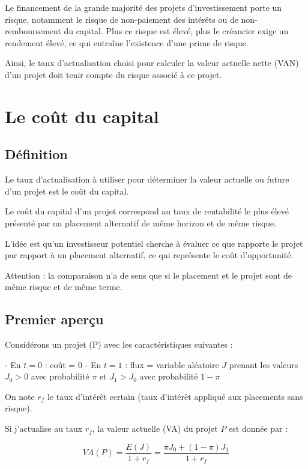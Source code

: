 \documentclass[a4paper, 12pt]{report}
\begin{document}
Le financement de la grande majorité des projets d'investissement porte un risque, notamment le risque de non-paiement des intérêts ou de non-remboursement du capital. Plus ce risque est élevé, plus le créancier exige un rendement élevé, ce qui entraîne l'existence d'une prime de risque.

Ainsi, le taux d'actualisation choisi pour calculer la valeur actuelle nette (VAN) d'un projet doit tenir compte du risque associé à ce projet.

\section{Le coût du capital}

\subsection{Définition}

Le taux d'actualisation à utiliser pour déterminer la valeur actuelle ou future d'un projet est le coût du capital.

Le coût du capital d’un projet correspond au taux de rentabilité le plus élevé présenté par un placement alternatif de même horizon et de même risque.

L’idée est qu'un investisseur potentiel cherche à évaluer ce que rapporte le projet par rapport à un placement alternatif, ce qui représente le coût d’opportunité. 

Attention : la comparaison n'a de sens que si le placement et le projet sont de même risque et de même terme.

\subsection{Premier aperçu}

Considérons un projet (P) avec les caractéristiques suivantes :

- En \( t = 0 \) : coût = 0
- En \( t = 1 \) : flux = variable aléatoire \( J \) prenant les valeurs \( J_0 > 0 \) avec probabilité \( \pi \) et \( J_1 > J_0 \) avec probabilité \( 1 - \pi \)

On note \( r_f \) le taux d’intérêt certain (taux d’intérêt appliqué aux placements sans risque).

Si j’actualise au taux \( r_f \), la valeur actuelle (VA) du projet \( P \) est donnée par :

\[
VA(P) = \frac{E(J)}{1 + r_f} = \frac{\pi J_0 + (1 - \pi) J_1}{1 + r_f}
\]
\end{document}
